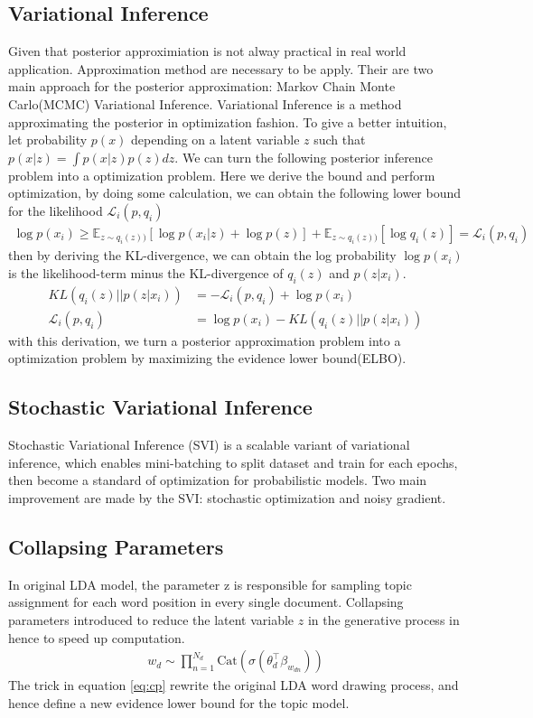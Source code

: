 \subsection{Variational Inference}
Given that posterior approximiation is not alway practical in real world application. Approximation method are necessary to be apply. Their are two main approach for the posterior approximation: Markov Chain Monte Carlo(MCMC) Variational Inference. Variational Inference is a method approximating the posterior in optimization fashion. To give a better intuition, let probability $ p(x) $ depending on a latent variable $ z $ such that $ p(x|z)=\int p(x|z)p(z)dz $. We can turn the following posterior inference problem into a optimization problem. Here we derive the bound and perform optimization, by doing some calculation, we can obtain the following lower bound for the likelihood $ \mathcal{L}_i(p,q_i) $
\begin{align}
\log p(x_i)\geq\mathbb{E}_{z\sim q_i(z))}[\log p(x_i|z)+\log p(z)]+\mathbb{E}_{z\sim q_i(z))}[\log q_i(z)]=\mathcal{L}_i(p,q_i)
\end{align}
then by deriving the KL-divergence, we can obtain the log probability $ \log p(x_i) $ is the likelihood-term minus the KL-divergence of $ q_i(z) $ and $ p(z|x_i) $.
\begin{align}
KL(q_i(z)||p(z|x_i))&=-\mathcal{L}_i(p,q_i)+\log p(x_i)\\
\mathcal{L}_i(p,q_i)&=\log p(x_i)-KL(q_i(z)||p(z|x_i))
\end{align}
with this derivation, we turn a posterior approximation problem into a optimization problem by maximizing the evidence lower bound(ELBO).
\subsection{Stochastic Variational Inference}
Stochastic Variational Inference (SVI)\cite{hoffman_stochastic_2013} is a scalable variant of variational inference, which enables mini-batching to split dataset and train for each epochs, then become a standard of optimization for probabilistic models.
Two main improvement are made by the SVI: stochastic optimization and noisy gradient.
\subsection{Collapsing Parameters}
In original LDA model, the parameter z is responsible for sampling topic assignment for each word position in every single document. Collapsing parameters\cite{srivastava_autoencoding_2017} introduced to reduce the latent variable $ z $ in the generative process in hence to speed up computation.
\begin{align}\label{eq:cp}
w_d\sim\prod_{n=1}^{N_d}\text{Cat}(\sigma(\theta_d^\top\beta_{w_{dn}}))
\end{align}
The trick in equation \ref{eq:cp} rewrite the original LDA word drawing process, and hence define a new evidence lower bound for the topic model.

